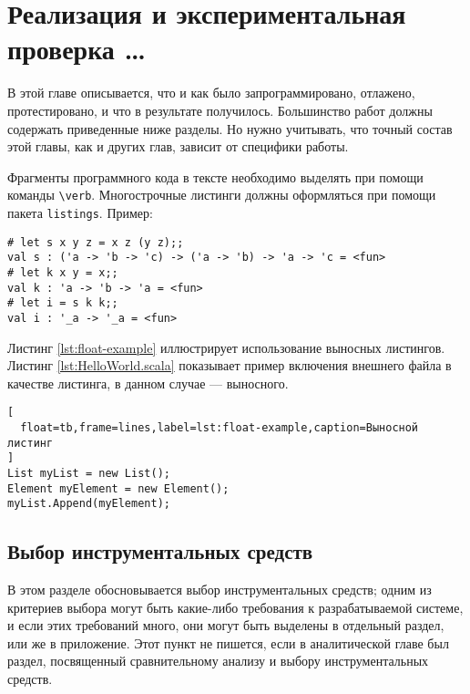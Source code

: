 \chapter{Реализация и экспериментальная проверка \dots}

В этой главе описывается, что и как было запрограммировано, отлажено, 
протестировано, и что в результате получилось. Большинство работ должны 
содержать приведенные ниже разделы. Но нужно учитывать, что точный состав 
этой главы, как и других глав, зависит от специфики работы.

Фрагменты программного кода в тексте необходимо выделять при помощи команды 
\verb|\verb|. Многострочные листинги должны оформляться при помощи пакета 
\verb|listings|. Пример:

\begin{lstlisting}
# let s x y z = x z (y z);;
val s : ('a -> 'b -> 'c) -> ('a -> 'b) -> 'a -> 'c = <fun>
# let k x y = x;;
val k : 'a -> 'b -> 'a = <fun>
# let i = s k k;;
val i : '_a -> '_a = <fun>
\end{lstlisting}

Листинг \ref{lst:float-example} иллюстрирует использование выносных листингов.
Листинг \ref{lst:HelloWorld.scala} показывает пример включения внешнего файла 
в качестве листинга, в данном случае --- выносного.

\begin{lstlisting}[
  float=tb,frame=lines,label=lst:float-example,caption=Выносной листинг
]
List myList = new List();
Element myElement = new Element();
myList.Append(myElement);
\end{lstlisting}



\section{Выбор инструментальных средств}

В этом разделе обосновывается выбор инструментальных средств; одним из критериев выбора могут быть какие-либо требования к разрабатываемой системе, и если этих требований много, они могут быть выделены в отдельный раздел, или же в приложение. Этот пункт не пишется, если в аналитической главе был раздел, посвященный сравнительному анализу и выбору инструментальных средств.




